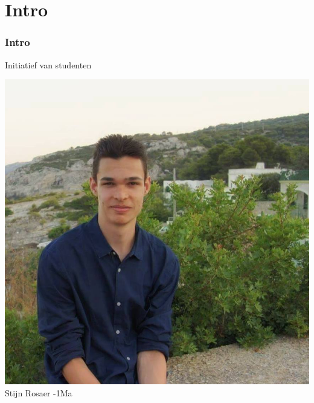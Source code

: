 
\section{Intro}
\addtocounter{minutes}{2}
\begin{frame}%
	\frametitle{Intro}%
    Initiatief van studenten
	\vspace{0.2cm}
	
   	\centering%
   	\begin{minipage}{0.30\linewidth}%
        \centering%
		\includegraphics[width=\linewidth]{res/stijn} \\%
        \footnotesize Stijn Rosaer -1Ma\strut%
    \end{minipage}
    \begin{minipage}{0.30\linewidth}%
        \centering%

\end{minipage}
\end{frame}
